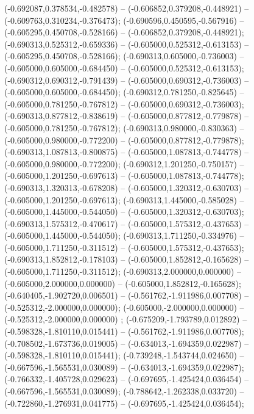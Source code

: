  (-0.692087,0.378534,-0.482578) -- (-0.606852,0.379208,-0.448921) -- (-0.609763,0.310234,-0.376473);
 (-0.690596,0.450595,-0.567916) -- (-0.605295,0.450708,-0.528166) -- (-0.606852,0.379208,-0.448921);
 (-0.690313,0.525312,-0.659336) -- (-0.605000,0.525312,-0.613153) -- (-0.605295,0.450708,-0.528166);
 (-0.690313,0.605000,-0.736003) -- (-0.605000,0.605000,-0.684450) -- (-0.605000,0.525312,-0.613153);
 (-0.690312,0.690312,-0.791439) -- (-0.605000,0.690312,-0.736003) -- (-0.605000,0.605000,-0.684450);
 (-0.690312,0.781250,-0.825645) -- (-0.605000,0.781250,-0.767812) -- (-0.605000,0.690312,-0.736003);
 (-0.690313,0.877812,-0.838619) -- (-0.605000,0.877812,-0.779878) -- (-0.605000,0.781250,-0.767812);
 (-0.690313,0.980000,-0.830363) -- (-0.605000,0.980000,-0.772200) -- (-0.605000,0.877812,-0.779878);
 (-0.690313,1.087813,-0.800875) -- (-0.605000,1.087813,-0.744778) -- (-0.605000,0.980000,-0.772200);
 (-0.690312,1.201250,-0.750157) -- (-0.605000,1.201250,-0.697613) -- (-0.605000,1.087813,-0.744778);
 (-0.690313,1.320313,-0.678208) -- (-0.605000,1.320312,-0.630703) -- (-0.605000,1.201250,-0.697613);
 (-0.690313,1.445000,-0.585028) -- (-0.605000,1.445000,-0.544050) -- (-0.605000,1.320312,-0.630703);
 (-0.690313,1.575312,-0.470617) -- (-0.605000,1.575312,-0.437653) -- (-0.605000,1.445000,-0.544050);
 (-0.690313,1.711250,-0.334976) -- (-0.605000,1.711250,-0.311512) -- (-0.605000,1.575312,-0.437653);
 (-0.690313,1.852812,-0.178103) -- (-0.605000,1.852812,-0.165628) -- (-0.605000,1.711250,-0.311512);
 (-0.690313,2.000000,0.000000) -- (-0.605000,2.000000,0.000000) -- (-0.605000,1.852812,-0.165628);
 (-0.640405,-1.902720,0.006501) -- (-0.561762,-1.911986,0.007708) -- (-0.525312,-2.000000,0.000000);
 (-0.605000,-2.000000,0.000000) -- (-0.525312,-2.000000,0.000000) ;
 (-0.675209,-1.793789,0.012892) -- (-0.598328,-1.810110,0.015441) -- (-0.561762,-1.911986,0.007708);
 (-0.708502,-1.673736,0.019005) -- (-0.634013,-1.694359,0.022987) -- (-0.598328,-1.810110,0.015441);
 (-0.739248,-1.543744,0.024650) -- (-0.667596,-1.565531,0.030089) -- (-0.634013,-1.694359,0.022987);
 (-0.766332,-1.405728,0.029623) -- (-0.697695,-1.425424,0.036454) -- (-0.667596,-1.565531,0.030089);
 (-0.788642,-1.262338,0.033720) -- (-0.722860,-1.276931,0.041775) -- (-0.697695,-1.425424,0.036454);
